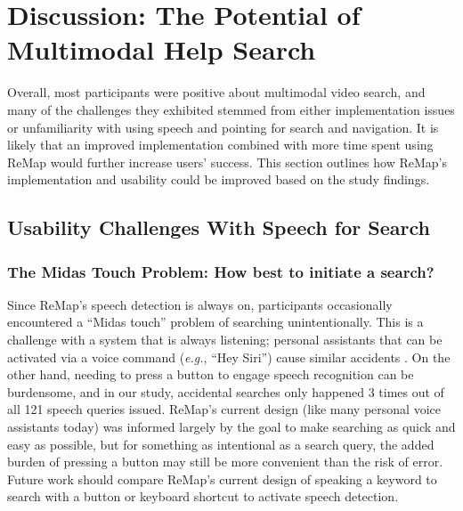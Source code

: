 \section{Discussion: The Potential of Multimodal Help Search}
Overall, most participants were positive about multimodal video search, and many of the challenges they exhibited stemmed from either implementation issues or unfamiliarity with using speech and pointing for search and navigation. It is likely that an improved implementation combined with more time spent using ReMap would further increase users' success. This section outlines how ReMap's implementation and usability could be improved based on the study findings.

\subsection{Usability Challenges With Speech for Search}
\subsubsection{The Midas Touch Problem: How best to initiate a search?}
Since ReMap's speech detection is always on, participants occasionally encountered a ``Midas touch'' problem \cite{Jacob1990} of searching unintentionally. This is a challenge with a system that is always listening; personal assistants that can be activated via a voice command (\textit{e.g.}, ``Hey Siri'') cause similar accidents \cite{Hern2019}. On the other hand, needing to press a button to engage speech recognition can be burdensome, and in our study, accidental searches only happened 3 times out of all 121 speech queries issued. ReMap's current design (like many personal voice assistants today) was informed largely by the goal to make searching as quick and easy as possible, but for something as intentional as a search query, the added burden of pressing a button may still be more convenient than the risk of error. Future work should compare ReMap's current design of speaking a keyword to search with a button or keyboard shortcut to activate speech detection. 

